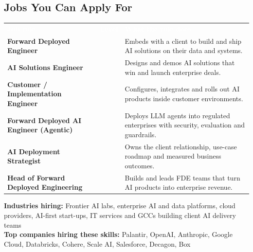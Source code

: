 \documentclass[10pt,a4paper]{article}
\newcommand{\hdr}{\rowcolor{navy}}
\newcommand{\hw}[1]{\textcolor{white}{\bfseries #1}}
\begin{document}
\subsection*{Jobs You Can Apply For}
\par{\small\begin{tabularx}{\linewidth}{@{}>{\raggedright\arraybackslash}p{4.6cm}>{\raggedright\arraybackslash}p{2.5cm}Y@{}}\hdr\hw{Job role}&\hw{Level}&\hw{What the role does}\\
\textbf{Forward Deployed Engineer} &  & Embeds with a client to build and ship AI solutions on their data and systems.\\
\textbf{AI Solutions Engineer} &  & Designs and demos AI solutions that win and launch enterprise deals.\\
\textbf{Customer / Implementation Engineer} &  & Configures, integrates and rolls out AI products inside customer environments.\\
\textbf{Forward Deployed AI Engineer (Agentic)} &  & Deploys LLM agents into regulated enterprises with security, evaluation and guardrails.\\
\textbf{AI Deployment Strategist} &  & Owns the client relationship, use-case roadmap and measured business outcomes.\\
\textbf{Head of Forward Deployed Engineering} &  & Builds and leads FDE teams that turn AI products into enterprise revenue.\\
\end{tabularx}}
{\small\textbf{Industries hiring:} Frontier AI labs, enterprise AI and data platforms, cloud providers, AI-first start-ups, IT services and GCCs building client AI delivery teams\\[2pt]\textbf{Top companies hiring these skills:} Palantir, OpenAI, Anthropic, Google Cloud, Databricks, Cohere, Scale AI, Salesforce, Decagon, Box}
\end{document}
